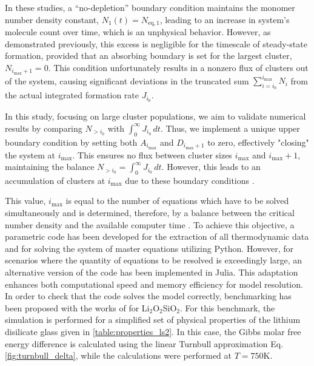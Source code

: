 In these studies, a ``no-depletion'' boundary condition maintains the monomer number density 
constant, \( N_1(t) = N_{\text{eq},1} \), leading to an increase in system's molecule count over time, 
which is an unphysical behavior. However, as demonstrated previously, this excess is negligible for the 
timescale of steady-state formation, provided that an absorbing boundary is set for the largest cluster, \( N_{i_{\text{max}} + 1} = 0 \). 
This condition unfortunately results in a nonzero flux of clusters out of the system, causing significant deviations in the truncated 
sum \( \sum_{i=i_0}^{i_{\text{max}}} N_i \) from the actual integrated formation rate \( J_{i_0} \).

In this study, focusing on large cluster populations, we aim to validate numerical results by 
comparing \( N_{> i_0} \) with \( \int_0^\infty J_{i_0} \, dt \). Thus, we implement a unique upper boundary 
condition by setting both \( A_{i_{\text{max}}} \) and \( D_{i_{\text{max}} + 1} \) to zero, effectively "closing" the system at \( i_{\text{max}} \). 
This ensures no flux between cluster sizes \( i_{\text{max}} \) and \( i_{\text{max}} + 1 \), maintaining the balance \( N_{> i_0} = \int_0^\infty J_{i_0} \, dt \). 
However, this leads to an accumulation of clusters at \( i_{\text{max}} \) due to these boundary conditions \cite{Laszlo4,Kelton1986}.

This value, \( i_{\text{max}} \) is equal to the number of equations which have to be solved simultaneously and is determined, therefore, by a balance between 
the critical number density and the available computer time \cite{Bartels1991}. To achieve this objective, a parametric code has been developed for the extraction of all 
thermodynamic data and for solving the system of master equations utilizing Python. However, for scenarios where the quantity of equations to be resolved 
is exceedingly large, an alternative version of the code has been implemented in Julia. This adaptation enhances both computational speed and memory 
efficiency for model resolution.
In order to check that the code solves the model correctly, benchmarking has been proposed with the works of \cite{Laszlo1, Neilson1979, Kelton1983, Laszlo3, Laszlo4, Sun2009}
for Li\(_2\)O\(_2\)SiO\(_2\).
For this benchmark, the simulation is performed for a simplified set of physical properties of the lithium disilicate glass given in \ref{table:properties_ls2}. In this case, 
the Gibbs molar free energy difference is calculated using the linear Turnbull approximation Eq. \ref{fig:turnbull_delta}, while the calculations were performed at $T = 750 \text{K}$.

